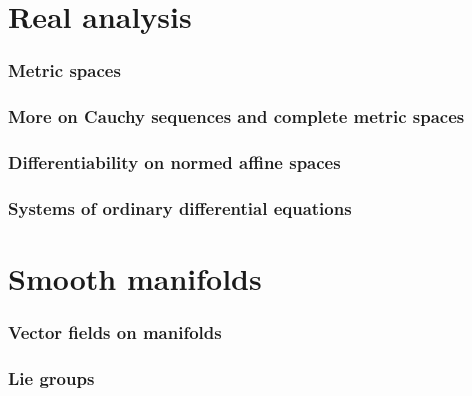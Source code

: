 \documentclass{article}
\theoremstyle{definition}
\begin{document}
\part{Real analysis}

\section{Metric spaces}
\label{section:metric_spaces}


\section{More on Cauchy sequences and complete metric spaces}
\label{section:cauchy_sequences}


\section{Differentiability on normed affine spaces}
\label{section:differentiability_on_normed_affine_spaces}


\section{Systems of ordinary differential equations}
\label{section:systems_of_ordinary_differential_equations}


\part{Smooth manifolds}

\section{Vector fields on manifolds}
\label{section:vector_fields_on_manifolds}







\section{Lie groups}
\label{section:lie_groups}

\end{document}
